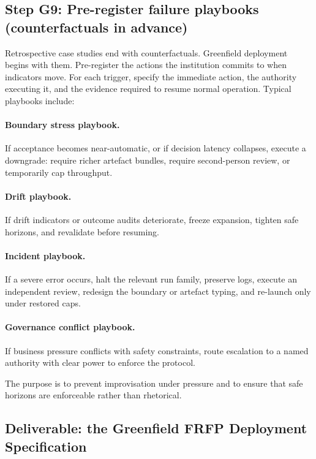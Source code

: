 \subsection{Step G9: Pre-register failure playbooks (counterfactuals in advance)}

Retrospective case studies end with counterfactuals. Greenfield deployment begins with them. Pre-register the actions the institution commits to when indicators move. For each trigger, specify the immediate action, the authority executing it, and the evidence required to resume normal operation. Typical playbooks include:

\paragraph{Boundary stress playbook.}
If acceptance becomes near-automatic, or if decision latency collapses, execute a downgrade: require richer artefact bundles, require second-person review, or temporarily cap throughput.

\paragraph{Drift playbook.}
If drift indicators or outcome audits deteriorate, freeze expansion, tighten safe horizons, and revalidate before resuming.

\paragraph{Incident playbook.}
If a severe error occurs, halt the relevant run family, preserve logs, execute an independent review, redesign the boundary or artefact typing, and re-launch only under restored caps.

\paragraph{Governance conflict playbook.}
If business pressure conflicts with safety constraints, route escalation to a named authority with clear power to enforce the protocol.

The purpose is to prevent improvisation under pressure and to ensure that safe horizons are enforceable rather than rhetorical.

\subsection{Deliverable: the Greenfield FRFP Deployment Specification}

